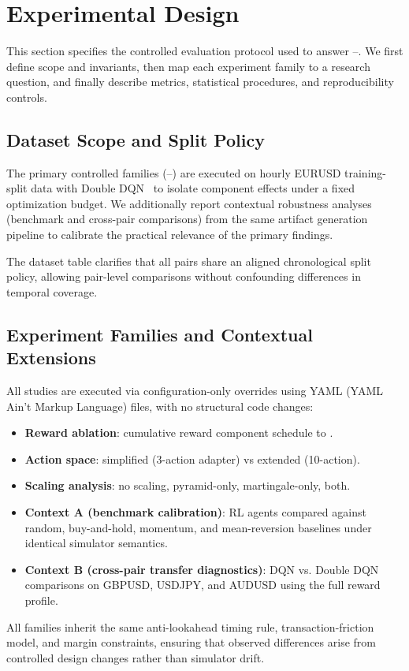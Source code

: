 \section{Experimental Design}
\label{sec:experiments}

This section specifies the controlled evaluation protocol used to answer --. We first define scope and invariants, then map each experiment family to a research question, and finally describe metrics, statistical procedures, and reproducibility controls.

\subsection{Dataset Scope and Split Policy}
The primary controlled families (--) are executed on hourly EURUSD training-split data with Double DQN~\citep{hasselt2016deep} to isolate component effects under a fixed optimization budget. We additionally report contextual robustness analyses (benchmark and cross-pair comparisons) from the same artifact generation pipeline to calibrate the practical relevance of the primary findings.



\noindent The dataset table clarifies that all pairs share an aligned chronological split policy, allowing pair-level comparisons without confounding differences in temporal coverage.

\subsection{Experiment Families and Contextual Extensions}
All studies are executed via configuration-only overrides using YAML (YAML Ain't Markup Language) files, with no structural code changes:
\begin{itemize}[leftmargin=1.4em]
	\item \textbf{ Reward ablation}: cumulative reward component schedule  to .
	\item \textbf{ Action space}: simplified (3-action adapter) vs extended (10-action).
	\item \textbf{ Scaling analysis}: no scaling, pyramid-only, martingale-only, both.
    \item \textbf{Context A (benchmark calibration)}: RL agents compared against random, buy-and-hold, momentum, and mean-reversion baselines under identical simulator semantics.
    \item \textbf{Context B (cross-pair transfer diagnostics)}: DQN vs. Double DQN comparisons on GBPUSD, USDJPY, and AUDUSD using the full reward profile.
\end{itemize}
All families inherit the same anti-lookahead timing rule, transaction-friction model, and margin constraints, ensuring that observed differences arise from controlled design changes rather than simulator drift.

